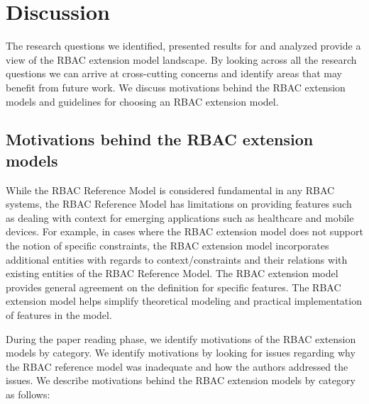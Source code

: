 \section{Discussion} \label{sec:discussion}

The research questions we identified, presented results for and analyzed provide a view of the RBAC extension model landscape. 
By looking across all the research questions we can arrive at cross-cutting concerns and identify areas that may benefit from future work.
We discuss motivations behind the RBAC extension models and guidelines for choosing an RBAC extension model.

\subsection{Motivations behind the RBAC extension models}

While the RBAC Reference Model is considered fundamental in any RBAC systems, the RBAC Reference Model has limitations on providing features such as dealing with context for emerging applications such as healthcare and mobile devices. For example, in cases where the RBAC extension model does not support the notion of specific constraints, the RBAC extension model incorporates additional entities with regards to context/constraints and their relations with existing entities of the RBAC Reference Model. The RBAC extension model provides general agreement on the definition for specific features. The RBAC extension model helps simplify theoretical modeling and practical implementation of features in the model. 

During the paper reading phase, we identify motivations of the RBAC extension models by category. We identify motivations by looking for issues regarding why the RBAC reference model was inadequate and how the authors addressed the issues. We describe motivations behind the RBAC extension models by category as follows:

